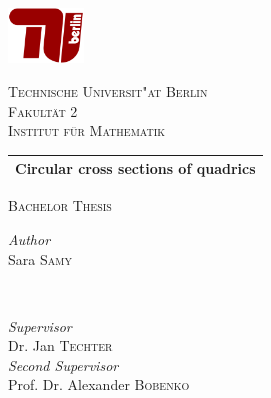 \documentclass[10pt, a4paper]{article}
\theoremstyle{BoldTopSpacing}
\theoremstyle{BoldTopSpacing}
\theoremstyle{BoldTopSpacing}
\theoremstyle{BoldTopBottomSpacing}
\theoremstyle{BoldTopSpacing}
\theoremstyle{BoldTopBottomSpacing}
\theoremstyle{remark}
\begin{document}
\color{RichBlack}


\begin{titlepage}
\newcommand{\HRule}{\rule{\linewidth}{0.5mm}}
\begin{center}

\includegraphics[width=0.15\textwidth]{TU-Berlin-Logo.png}\\[1cm]
\begin{otherlanguage}{german}
\textsc{\LARGE Technische Universit"at Berlin}\\[1.5cm]
\textsc{\large Fakult\"at 2}\\[0.5cm]
\textsc{\large Institut f\"ur Mathematik}\\[0.5cm]
\end{otherlanguage}

\setlength{\aboverulesep}{10pt}
\setlength{\belowrulesep}{13pt}
\begin{tabularx}{\textwidth}{ >{\centering\arraybackslash}X}
\midrule[0.5mm]
\huge\bfseries Circular cross sections of quadrics\\
\midrule[0.5mm]
\end{tabularx}

\textsc{\large Bachelor Thesis}\\[1.5cm]

\begin{minipage}{0.4\textwidth}
    \begin{flushleft}
        \large
        \textit{\textcolor{TUColor}{Author}}\\
        Sara \textsc{Samy}
    \end{flushleft}
\end{minipage}
~
\begin{minipage}{0.4\textwidth}
    \begin{flushright}
        \large
        \textit{\textcolor{TUColor}{Supervisor}}\\
        Dr. Jan \textsc{Techter}\\
        \large
        \textit{\textcolor{TUColor}{Second Supervisor}}\\
        Prof. Dr. Alexander \textsc{Bobenko}
    \end{flushright}
\end{minipage}


\end{center}
\end{titlepage}
\end{document}
